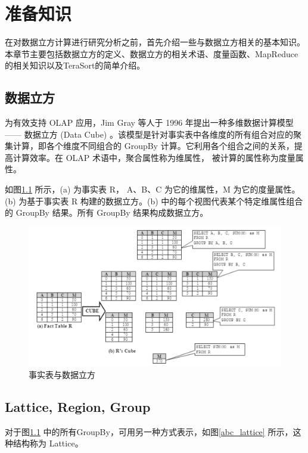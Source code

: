 \chapter{准备知识}

在对数据立方计算进行研究分析之前，首先介绍一些与数据立方相关的基本知识。本章节主要包括数据立方的定义、数据立方的相关术语、度量函数、MapReduce的相关知识以及TeraSort的简单介绍。

\section{数据立方}
为有效支持 OLAP 应用，Jim Gray 等人于 1996 年提出一种多维数据计算模型 —— 数据立方 (Data Cube) \cite{gray1997data}。该模型是针对事实表中各维度的所有组合对应的聚集计算，即各个维度不同组合的 GroupBy 计算。它利用各个组合之间的关系，提高计算效率。在 OLAP 术语中，聚合属性称为维属性， 被计算的属性称为度量属性。

如图\ref{fact_table_data_cube} 所示，(a) 为事实表 R， A、B、C 为它的维属性，M 为它的度量属性。(b) 为基于事实表 R 构建的数据立方。(b) 中的每个视图代表某个特定维属性组合的 GroupBy 结果。所有 GroupBy 结果构成数据立方。

\begin{figure}[!htb]
\centering\includegraphics[width=6in]{picture/ch_preliminary/fact_table_data_cube} 
\caption{事实表与数据立方}\label{fact_table_data_cube} 
\end{figure} 

\section{Lattice, Region, Group}

对于图\ref{fact_table_data_cube} 中的所有GroupBy，可用另一种方式表示，如图\ref{abc_lattice} 所示，这种结构称为 Lattice。

